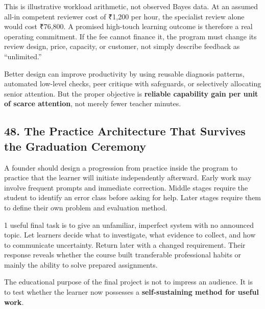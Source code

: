 This is illustrative workload arithmetic, not observed Bayes data. At an assumed all-in competent reviewer cost of ₹1,200 per hour, the specialist review alone would cost ₹76,800. A promised high-touch learning outcome is therefore a real operating commitment. If the fee cannot finance it, the program must change its review design, price, capacity, or customer, not simply describe feedback as ``unlimited.''

Better design can improve productivity by using reusable diagnosis patterns, automated low-level checks, peer critique with safeguards, or selectively allocating senior attention. But the proper objective is \textbf{reliable capability gain per unit of scarce attention}, not merely fewer teacher minutes.

\subsection*{48. The Practice Architecture That Survives the Graduation Ceremony}

A founder should design a progression from practice inside the program to practice that the learner will initiate independently afterward. Early work may involve frequent prompts and immediate correction. Middle stages require the student to identify an error class before asking for help. Later stages require them to define their own problem and evaluation method.

1 useful final task is to give an unfamiliar, imperfect system with no announced topic. Let learners decide what to investigate, what evidence to collect, and how to communicate uncertainty. Return later with a changed requirement. Their response reveals whether the course built transferable professional habits or mainly the ability to solve prepared assignments.

The educational purpose of the final project is not to impress an audience. It is to test whether the learner now possesses a \textbf{self-sustaining method for useful work}.
